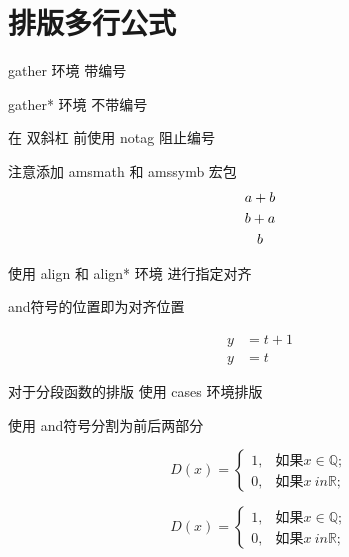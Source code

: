 \documentclass[UTF8]{article}
\date{\today}
\begin{document}
	\section{排版多行公式}
	gather 环境 带编号
	
	gather* 环境   不带编号
	
	在 双斜杠 前使用  notag 阻止编号
	
	注意添加  amsmath 和  amssymb 宏包
	\begin{gather}
		a+b \\
		b+a \\
		b \notag 
	\end{gather}
	
	使用 align 和 align* 环境 进行指定对齐
	
	and符号的位置即为对齐位置
	
	\begin{align}
		y & = t+1 \\
		y & = t 
	\end{align}
	
	对于分段函数的排版 使用 cases 环境排版
	
	使用 and符号分割为前后两部分
	
	\begin{equation}
		D(x) = \begin{cases}
			1,& \text{如果} x \in \mathbb{Q} ;\\
			0,& \text{如果} x\ in \mathbb{R} ; 
		\end{cases}
	\end{equation}
	
	
	\begin{equation*}
	D(x) = \begin{cases}
	1,& \text{如果} x \in \mathbb{Q} ;\\
	0,& \text{如果} x\ in \mathbb{R} ; 
	\end{cases}
	\end{equation*}
	
	
	
	
	
\end{document}
